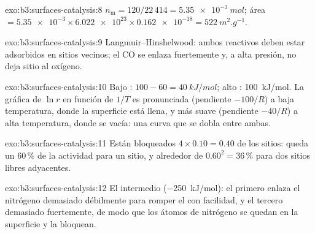 \begin{solution}{exo:b3:surfaces-catalysis:8}
$n_{\mathrm m} = 120/22\,414 = \qty{5.35e-3}{mol}$; área $= \num{5.35e-3} \times \num{6.022e23} \times \num{0.162e-18} =
\qty{522}{m^2.g^{-1}}$.
\end{solution}

\begin{solution}{exo:b3:surfaces-catalysis:9}
Langmuir--Hinshelwood: ambos reactivos deben estar adsorbidos en sitios vecinos;
el CO se enlaza fuertemente y, a alta presión, no deja sitio al oxígeno.
\end{solution}

\begin{solution}{exo:b3:surfaces-catalysis:10}
Bajo : $100 - 60 = \qty{40}{kJ/mol}$; alto : \qty{100}{kJ/mol}. La gráfica de $\ln r$
en función de $1/T$ es pronunciada (pendiente $-100/R$) a baja temperatura, donde la superficie está
llena, y más suave (pendiente $-40/R$) a alta temperatura, donde se vacía: una curva
que se dobla entre ambas.
\end{solution}

\begin{solution}{exo:b3:surfaces-catalysis:11}
Están bloqueados $4 \times 0.10 = 0.40$ de los sitios: queda un 60\,\% de la actividad para un
sitio, y alrededor de $0.60^2 = 36\,\%$ para dos sitios libres adyacentes.
\end{solution}

\begin{solution}{exo:b3:surfaces-catalysis:12}
El intermedio (\qty{-250}{kJ/mol}): el primero enlaza el nitrógeno demasiado débilmente para romper el 
con facilidad, y el tercero demasiado fuertemente, de modo que los átomos de nitrógeno se quedan en la superficie
y la bloquean.
\end{solution}

